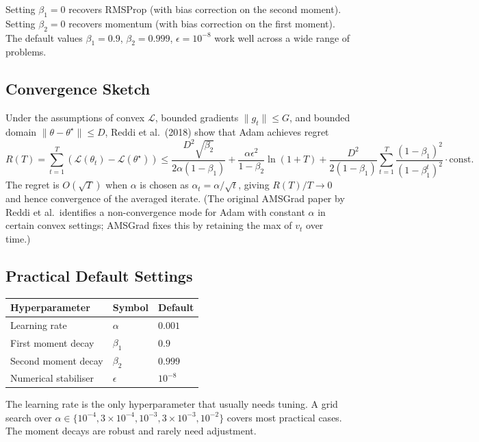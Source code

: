 Setting $\beta_1 = 0$ recovers RMSProp (with bias correction on the
second moment). Setting $\beta_2 = 0$ recovers momentum (with bias
correction on the first moment). The default values $\beta_1 = 0.9$,
$\beta_2 = 0.999$, $\epsilon = 10^{-8}$ work well across a wide range
of problems.

\subsection{Convergence Sketch}

Under the assumptions of convex $\mathcal{L}$, bounded gradients
$\|g_t\| \le G$, and bounded domain $\|\theta - \theta^\star\| \le D$,
Reddi et al.\ (2018) show that Adam achieves regret
\[
R(T) = \sum_{t=1}^{T} (\mathcal{L}(\theta_t) - \mathcal{L}(\theta^\star)) \le \frac{D^2 \sqrt{\beta_2}}{2 \alpha (1 - \beta_1)} + \frac{\alpha \epsilon^2}{1 - \beta_2} \ln(1 + T) + \frac{D^2}{2 (1 - \beta_1)} \sum_{t=1}^{T} \frac{(1 - \beta_1)^2}{(1 - \beta_1^t)^2} \cdot \text{const}.
\]
The regret is $O(\sqrt{T})$ when $\alpha$ is chosen as $\alpha_t =
\alpha / \sqrt{t}$, giving $R(T)/T \to 0$ and hence convergence of
the averaged iterate. (The original AMSGrad paper by Reddi et al.\
identifies a non-convergence mode for Adam with constant $\alpha$
in certain convex settings; AMSGrad fixes this by retaining the max
of $v_t$ over time.)

\subsection{Practical Default Settings}

\begin{center}
\begin{tabular}{lll}
\toprule
\textbf{Hyperparameter} & \textbf{Symbol} & \textbf{Default} \\
\midrule
Learning rate     & $\alpha$   & $0.001$ \\
First moment decay & $\beta_1$ & $0.9$ \\
Second moment decay & $\beta_2$ & $0.999$ \\
Numerical stabiliser & $\epsilon$ & $10^{-8}$ \\
\bottomrule
\end{tabular}
\end{center}

The learning rate is the only hyperparameter that usually needs
tuning. A grid search over $\alpha \in \{10^{-4}, 3 \times 10^{-4},
10^{-3}, 3 \times 10^{-3}, 10^{-2}\}$ covers most practical cases.
The moment decays are robust and rarely need adjustment.

